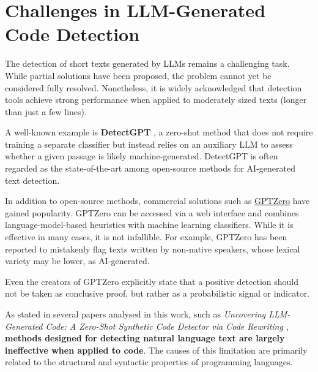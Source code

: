 \clearpage
\section{Challenges in LLM-Generated Code Detection}
\label{sec:Challenges in LLM-Generated Code Detection}
The detection of short texts generated by LLMs remains 
a challenging task. While partial solutions have been 
proposed, the problem cannot yet be considered fully 
resolved. Nonetheless, it is widely acknowledged that 
detection tools achieve strong performance when applied 
to moderately sized texts (longer than just a few lines).

A well-known example is \textbf{DetectGPT}
\cite{mitchell2023detectgpt}, a 
zero-shot method that does not require training a 
separate classifier but instead relies on an 
auxiliary LLM to assess whether a given passage is 
likely machine-generated. 
DetectGPT is often regarded as the state-of-the-art 
among open-source methods for AI-generated text detection.


In addition to open-source methods, commercial 
solutions such as \href{https://gptzero.me}{GPTZero} 
have gained 
popularity. GPTZero can be accessed via a web 
interface and combines language-model-based heuristics 
with machine learning classifiers. While it is 
effective in many cases, it is not infallible. 
For example, GPTZero has been reported to mistakenly 
flag texts written by non-native speakers, 
whose lexical variety may be lower, as AI-generated.

Even the creators of GPTZero explicitly state 
that a positive detection should not be taken as 
conclusive proof, but rather as a probabilistic 
signal or indicator.

\vspace{1\baselineskip}
\noindent

As stated in several papers analysed in this work, 
such as \textit{Uncovering LLM-Generated Code: A 
Zero-Shot Synthetic Code Detector via Code Rewriting 
\cite{ye2023uncovering}}, \textbf{methods designed for 
detecting natural language text are largely 
ineffective when applied to code}. The causes of 
this limitation are primarily related to the 
structural and syntactic properties of programming 
languages. 


